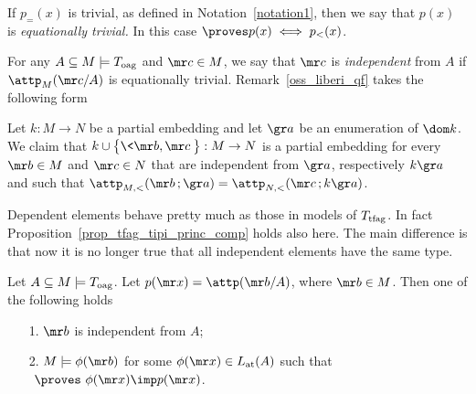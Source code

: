 If $p_{=}(x)$ is trivial, as defined in Notation~\ref{notation1}, then we say that $p(x)$ is \emph{equationally trivial.}
In this case $\proves p(x)\iff p_<(x)$.

For any $A\subseteq M\models T_{\rm oag}$ and ${\mr c}\in M$, we say that ${\mr c}$ is \emph{independent\/} from $A$ if $\attp_M({\mr c}/A)$ is equationally trivial.
Remark~\ref{oss_liberi_qf} takes the following form

\begin{remark}\label{rk_oag_ind}
  Let $k:M\to N$ be a partial embedding and let ${\gr a}$ be an enumeration of $\dom k$.
  We claim that $k\cup\big\{\<{\mr b},{\mr c}\>\big\}:M\to N$ is a partial embedding for every ${\mr b}\in M$ and ${\mr c}\in N$ that are independent from ${\gr a}$, respectively $k{\gr a}$ and such that $\attp_{M,<}({\mr b}\,;{\gr a})=\attp_{N,<}({\mr c}\,;k{\gr a})$. 
\end{remark}

Dependent elements behave pretty much as those in models of $T_{\rm tfag}$.
%
In fact Proposition~\ref{prop_tfag_tipi_princ_comp} holds also here. 
The main difference is that now it is no longer true that all independent elements have the same type.

\begin{proposition}\label{prop_oag_tipi_princ_comp}
  Let $A\subseteq M\models T_{\rm oag}$.
  Let $p({\mr x})=\attp({\mr b}/A)$, where ${\mr b} \in M$.
  Then one of the following holds   
  \begin{itemize}
  \item[1.] ${\mr b}$ is independent from $A$;
  \item[2.] $M\models\phi({\mr b})$ for some $\phi({\mr x})\in L_{\rm at}(A)$ such that $\ \proves\ \phi({\mr x})\imp p({\mr x})$.
  \end{itemize}
\end{proposition}

